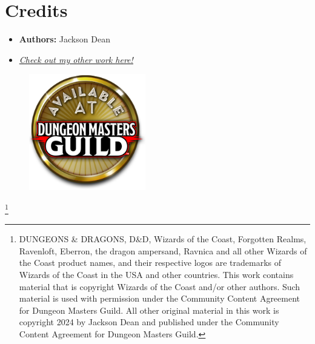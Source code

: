 \onecolumn
\section{Credits}
\begin{itemize}
    \item[] 
\textbf{Authors:} Jackson Dean\\

\item[]\textit{\href{https://www.dmsguild.com/browse.php?author=Jackson\%20Dean}{Check out my other work \underline{here!}}}
\end{itemize}

\vspace*{\fill}
\begin{figure}[h]
\centering
    \href{https://www.dmsguild.com/browse.php?author=Jackson\%20Dean}{\includegraphics[width=2in]{img/available_dms_guild.png}}
\end{figure}
\vspace*{\fill}

\newcommand\blfootnote[1]{%
  \begingroup
  \renewcommand\thefootnote{}\footnote{#1}%
  \addtocounter{footnote}{-1}%
  \endgroup
}
\blfootnote{ 
    DUNGEONS \& DRAGONS, D\&D, Wizards of the Coast, Forgotten Realms, Ravenloft, Eberron, the dragon ampersand, Ravnica and all other Wizards of the Coast product names, and their respective logos are trademarks of Wizards of the Coast in the USA and other countries.    
    This work contains material that is copyright Wizards of the Coast and/or other authors. Such material is used with permission under the Community Content Agreement for Dungeon Masters Guild.
    All other original material in this work is copyright 2024 by Jackson Dean and published under the Community Content Agreement for Dungeon Masters Guild.
}

\twocolumn
